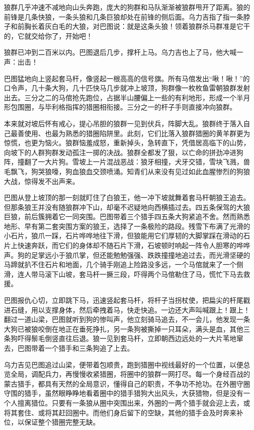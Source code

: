 \par 狼群几乎冲速不减地向山头奔跑，庞大的狗群和马队渐渐被狼群甩开了距离。狼的前锋是几条快狼，一条头狼和几条巨狼却处在前锋的侧后面。乌力吉指了指一条脖子和前胸长着灰白毛的大狼，对巴图说：就是这条头狼！领着狼群杀马群准是它干的，它就交给你了，开始吧！
\par 狼群已冲到二百米以内。巴图退后几步，撑杆上马。乌力吉也上了马，他大喊一声：出击！
\par 巴图猛地向上竖起套马杆，像竖起一根高高的信号旗。所有马倌发出“啾！啾！”的口令声，几十条大狗，几十匹快马几步就冲上坡顶，狗群像一枚枚鱼雷朝狼群发射出去。三分之二的马倌抢先跑位，占据半山腰偏上一些的有利地形，形成一个半月形包围圈，与毕利格指挥的猎圈相衔接。三分之一的杆子手则直接冲向狼群。
\par 本来就对坡后怀有戒心，提心吊胆的狼群一见到伏兵，阵脚大乱。狼群终于落入自己最善使用、也最为熟悉的猎圈陷阱里。此刻，它们比落入狼群猎圈的黄羊群更为惊慌，也更为恼火。狼群恼羞成怒，重新掉头，急转直下，凭借居高临下的山势，向坡下的人群狗群发动孤注一掷的决战。狼群全都发了狠，以亡命的拼劲冲进狗阵，撞翻了一大片狗。雪坡上一片混战恶战：狼牙相撞，犬牙交错，雪块飞溅，兽毛飘飞，狗哭狼嚎，狗血狼血交颈喷涌。知青们从来没有见过如此血腥惨烈的狗狼大战，惊得发不出声来。
\par 巴图从登上坡顶的那一刻就盯住了白狼王，他一冲下坡就舞着套马杆朝狼王追去。但那条狼王并没有随狼群冲下山，却毫不迟疑地向西横插过去。四五条保驾的大狼巨狼，前后簇拥着它一同突围。巴图带着三个猎手四五条大狗紧追不舍。然而熟悉地形、早有第二套突围方案的狼王，选择了一条极险的路段。残雪下布满了光滑的小石片，狼爪一踩，石片哗哗地往下滑，但狼能用它们厚韧的大脚掌踩在滑动的石片上快速奔跃，而它们的身体却不随石片下滑，石坡顿时响起一阵令人胆寒的哗哗声。狗的足掌远小于狼爪掌，但还能勉勉强强、跌跌撞撞地追过去，而光滑坚硬的马蹄就扒不住石片和地面，几个骑手刚追上险路没多远，一个马倌就来了一个侧滑，连人带马滚下山坡，套马杆一撅三段，吓得两个马倌勒住了马，慌忙下马去救援。
\par 巴图报仇心切，立即跳下马，迅速竖起套马杆，将杆子当拐杖使，把扁尖的杆尾戳进石缝，用以支撑身体，然后牵拽着马，快走快追。一边还大声叫喊跟上！跟上！翻过一道山梁，巴图就听到狗的惨叫声，他立刻骑马追去，不一会儿，他发现一条大狗已被狼咬倒在地正在垂死挣扎，另一条狗被撕掉一只耳朵，满头是血，其他三条狗吓得鬃毛倒竖直往后退。狼一见到套马杆，立即朝西边远处的一大片苇地窜去，巴图带着一个猎手和三条狗追了上去。
\par 乌力吉见巴图追过山梁，便带着包顺贵，跑到猎圈中视线最好的一个位置，以便总览全局，调配兵力，再慢慢收紧猎圈，将圈中的狼群一网打尽。每一个身经百战的蒙古猎手，都具有天然的全局意识，懂得自己的职责，不争功不抢功。在外圈守圈守围的猎手，虽然眼睁睁地看着圈中的猎手猎狗大出风头，大获猎物，但是没有一个人擅离猎位。只要有一条狼从圈中突围出来，外圈的一两个猎手就会迎上去，或将其套住、或将其赶回圈中。而他们身后留下的空缺，其他的猎手会及时奔来补位，以保证整个猎圈完整无缺。
